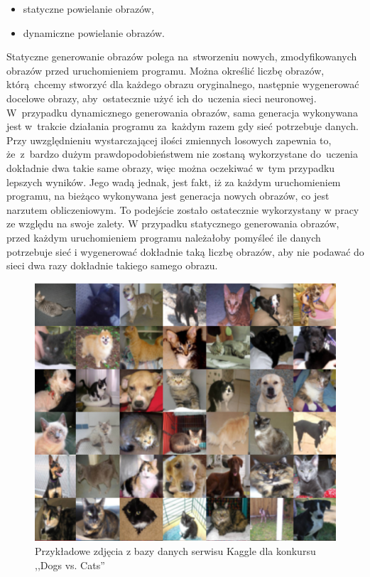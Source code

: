 \begin{itemize}
\item statyczne powielanie obrazów,
\item dynamiczne powielanie obrazów.
\end{itemize}
Statyczne generowanie obrazów polega na~stworzeniu nowych, zmodyfikowanych obrazów przed uruchomieniem programu. Można określić liczbę obrazów, którą~chcemy stworzyć dla każdego obrazu oryginalnego, następnie wygenerować docelowe obrazy, aby~ostatecznie użyć ich do~uczenia sieci neuronowej. W~przypadku dynamicznego generowania obrazów, sama generacja wykonywana jest w~trakcie działania programu za~każdym razem gdy sieć potrzebuje danych. Przy uwzględnieniu wystarczającej ilości zmiennych losowych zapewnia to, że~z~bardzo dużym prawdopodobieństwem nie zostaną wykorzystane do~uczenia dokładnie dwa takie same obrazy, więc można oczekiwać w~tym przypadku lepszych wyników. Jego wadą jednak, jest fakt, iż za każdym uruchomieniem programu, na bieżąco wykonywana jest generacja nowych obrazów, co jest narzutem obliczeniowym. To podejście zostało ostatecznie wykorzystany w pracy ze względu na swoje zalety. W przypadku statycznego generowania obrazów, przed każdym uruchomieniem programu należałoby pomyśleć ile danych potrzebuje sieć i wygenerować dokładnie taką liczbę obrazów, aby nie podawać do sieci dwa razy dokładnie takiego samego obrazu.

\begin{figure}[ht!]
\centering
\includegraphics[scale=0.8]{res/catsdogs.png}
\caption[Caption for LOF]{Przykładowe zdjęcia z bazy danych serwisu Kaggle dla konkursu ,,Dogs vs. Cats'' \label{catsdogs}}
\end{figure} 

